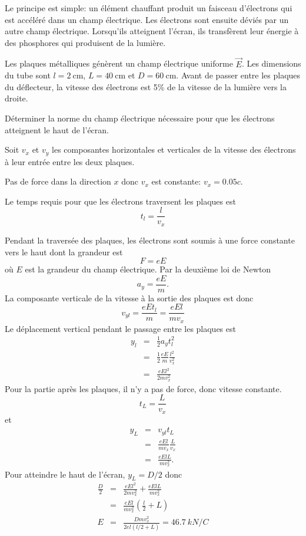 Le principe est simple: un élément chauffant produit un faisceau d'électrons
qui est accéléré dans un champ électrique. Les électrons sont ensuite déviés
par un autre champ électrique. Lorsqu'ils atteignent l'écran, ils transfèrent
leur énergie à des phosphores qui produisent de la lumière.

Les plaques métalliques génèrent un champ électrique uniforme $\vec{E}$.
Les dimensions du tube sont $l = \SI{2}{\centi\meter}$, $L =
\SI{40}{\centi\meter}$ et $D = \SI{60}{\centi\meter}$.  Avant de passer entre
les plaques du déflecteur, la vitesse des électrons est
5\% de la vitesse de la lumière vers la droite.

Déterminer la norme du champ électrique nécessaire pour que les électrons
atteignent le haut de l'écran.


Soit $v_x$ et $v_y$ les composantes horizontales et verticales de la vitesse
des électrons à leur entrée entre les deux plaques.

Pas de force dans la direction $x$ donc $v_x$ est constante: $v_x = 0.05c$.

Le temps requis pour que les électrons traversent les plaques est
\[
  t_l = \frac{l}{v_x}
\]

Pendant la traversée des plaques, les électrons sont soumis à une force
constante vers le haut dont la grandeur est
\[
  F = eE
\]
où $E$ est la grandeur du champ électrique. Par la deuxième loi de Newton
\[
  a_y = \frac{eE}{m}.
\]
La composante verticale de la vitesse à la sortie des plaques est donc
\[
  v_{yl} = \frac{eE t_l}{m} = \frac{eEl}{mv_x}
\]
Le déplacement vertical pendant le passage entre les plaques est
\begin{eqnarray*}
  y_l &=& \frac{1}{2} a_y t_l^2 \\
  &=& \frac{1}{2} \frac{eE}{m} \frac{l^2}{v_x^2} \\
  &=& \frac{eEl^2}{2mv_x^2}
\end{eqnarray*}
Pour la partie après les plaques, il n'y a pas de force, donc vitesse
constante.
\[
  t_L = \frac{L}{v_x}
\]
et
\begin{eqnarray*}
  y_L &=& v_{yl} t_L \\
  &=& \frac{eEl}{mv_x}\frac{L}{v_x} \\
  &=& \frac{eElL}{mv_x^2}.
\end{eqnarray*}
Pour atteindre le haut de l'écran, $y_L = D/2$ donc
\begin{eqnarray*}
  \frac{D}{2} &=& \frac{eEl^2}{2mv_x^2} + \frac{eElL}{mv_x^2} \\
   &=& \frac{eEl}{mv_x^2} \left(\frac{l}{2} + L\right) \\
  E &=& \frac{Dmv_x^2}{2el (l/2 + L)} = \SI{46.7}{kN/C}
\end{eqnarray*}
